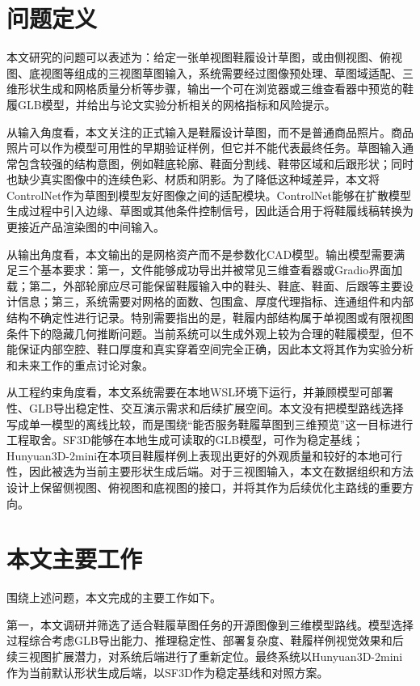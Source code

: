 \section{问题定义}

本文研究的问题可以表述为：给定一张单视图鞋履设计草图，或由侧视图、俯视图、底视图等组成的三视图草图输入，系统需要经过图像预处理、草图域适配、三维形状生成和网格质量分析等步骤，输出一个可在浏览器或三维查看器中预览的鞋履GLB模型，并给出与论文实验分析相关的网格指标和风险提示。

从输入角度看，本文关注的正式输入是鞋履设计草图，而不是普通商品照片。商品照片可以作为模型可用性的早期验证样例，但它并不能代表最终任务。草图输入通常包含较强的结构意图，例如鞋底轮廓、鞋面分割线、鞋带区域和后跟形状；同时也缺少真实图像中的连续色彩、材质和阴影。为了降低这种域差异，本文将ControlNet作为草图到模型友好图像之间的适配模块。ControlNet能够在扩散模型生成过程中引入边缘、草图或其他条件控制信号\citep{zhang2023controlnet}，因此适合用于将鞋履线稿转换为更接近产品渲染图的中间输入。

从输出角度看，本文输出的是网格资产而不是参数化CAD模型。输出模型需要满足三个基本要求：第一，文件能够成功导出并被常见三维查看器或Gradio界面加载；第二，外部轮廓应尽可能保留鞋履输入中的鞋头、鞋底、鞋面、后跟等主要设计信息；第三，系统需要对网格的面数、包围盒、厚度代理指标、连通组件和内部结构不确定性进行记录。特别需要指出的是，鞋履内部结构属于单视图或有限视图条件下的隐藏几何推断问题。当前系统可以生成外观上较为合理的鞋履模型，但不能保证内部空腔、鞋口厚度和真实穿着空间完全正确，因此本文将其作为实验分析和未来工作的重点讨论对象。

从工程约束角度看，本文系统需要在本地WSL环境下运行，并兼顾模型可部署性、GLB导出稳定性、交互演示需求和后续扩展空间。本文没有把模型路线选择写成单一模型的离线比较，而是围绕“能否服务鞋履草图到三维预览”这一目标进行工程取舍。SF3D能够在本地生成可读取的GLB模型，可作为稳定基线\citep{boss2024sf3d}；Hunyuan3D-2mini在本项目鞋履样例上表现出更好的外观质量和较好的本地可行性，因此被选为当前主要形状生成后端\citep{hunyuan3d2025hunyuan3d2}。对于三视图输入，本文在数据组织和方法设计上保留侧视图、俯视图和底视图的接口，并将其作为后续优化主路线的重要方向。

\section{本文主要工作}

围绕上述问题，本文完成的主要工作如下。

第一，本文调研并筛选了适合鞋履草图任务的开源图像到三维模型路线。模型选择过程综合考虑GLB导出能力、推理稳定性、部署复杂度、鞋履样例视觉效果和后续三视图扩展潜力，对系统后端进行了重新定位。最终系统以Hunyuan3D-2mini作为当前默认形状生成后端，以SF3D作为稳定基线和对照方案。

